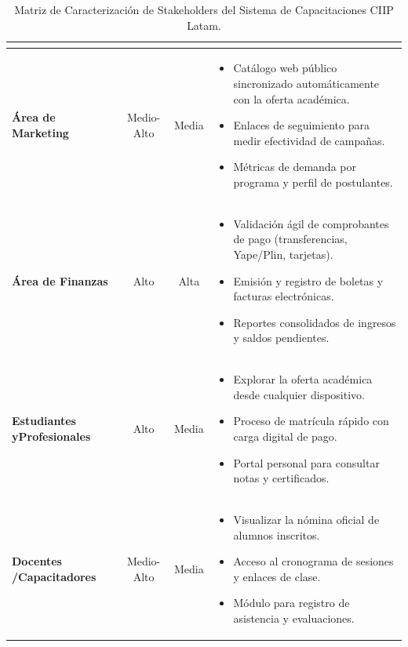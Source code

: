 \documentclass[11pt,a4paper]{article}
\begin{document}
\begin{table}[H]
\begin{tabularx}{\textwidth}{@{}p{3.5cm}ccX@{}}
\begin{itemize}[leftmargin=*,noitemsep,topsep=0pt]
        \end{itemize} \\
        \midrule
        \textbf{Área de Marketing} & Medio-Alto & Media & 
        \begin{itemize}[leftmargin=*,noitemsep,topsep=0pt]
            \item Catálogo web público sincronizado automáticamente con la oferta académica.
            \item Enlaces de seguimiento para medir efectividad de campañas.
            \item Métricas de demanda por programa y perfil de postulantes.
        \end{itemize} \\
        \midrule
        \textbf{Área de Finanzas} & Alto & Alta & 
        \begin{itemize}[leftmargin=*,noitemsep,topsep=0pt]
            \item Validación ágil de comprobantes de pago (transferencias, Yape/Plin, tarjetas).
            \item Emisión y registro de boletas y facturas electrónicas.
            \item Reportes consolidados de ingresos y saldos pendientes.
        \end{itemize} \\
        \midrule
        \textbf{Estudiantes y\newline Profesionales} & Alto & Media & 
        \begin{itemize}[leftmargin=*,noitemsep,topsep=0pt]
            \item Explorar la oferta académica desde cualquier dispositivo.
            \item Proceso de matrícula rápido con carga digital de pago.
            \item Portal personal para consultar notas y certificados.
        \end{itemize} \\
        \midrule
        \textbf{Docentes /\newline Capacitadores} & Medio-Alto & Media & 
        \begin{itemize}[leftmargin=*,noitemsep,topsep=0pt]
            \item Visualizar la nómina oficial de alumnos inscritos.
            \item Acceso al cronograma de sesiones y enlaces de clase.
            \item Módulo para registro de asistencia y evaluaciones.
        \end{itemize} \\
        \bottomrule
    \end{tabularx}
    \caption{Matriz de Caracterización de Stakeholders del Sistema de Capacitaciones CIIP Latam.}
\end{table}
\end{document}
